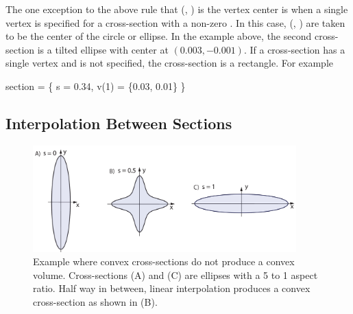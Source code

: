 The one exception to the above rule that (, ) is the
vertex center is when a single vertex  is specified for a
cross-section with a non-zero . In this case,
(, ) are taken to be the center of the circle or
ellipse. In the example above, the second cross-section is a
tilted ellipse with center at $(0.003, -0.001)$. If a cross-section
has a single vertex and  is
not specified, the cross-section is a rectangle. For example
\begin{example}
    section = \{ s = 0.34, v(1) = \{0.03, 0.01\} \}
\end{example}

\subsection{Interpolation Between Sections}
\label{s:wall.interpolation}

\begin{figure}[tb]
  \centering
  \includegraphics[width=4in]{concave-capillary.pdf}
  \caption[Convex cross-sections do not guarantee a convex volume.]
{Example where convex cross-sections do not produce a convex volume.
Cross-sections (A) and (C) are ellipses with a 5 to 1 aspect ratio.
Half way in between, linear interpolation produces a convex cross-section
as shown in (B).} 
  \label{f:concave.capillary}
\end{figure}

